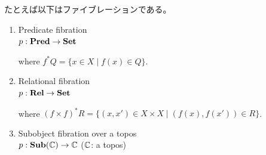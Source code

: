 \documentclass[
		head_space=20mm,
		foot_space=20mm,
		gutter=10mm,
		line_length=190mm
]{jlreq}
\begin{document}
\begin{example}
	たとえば以下はファイブレーションである。
	\begin{enumerate}
		\item Predicate fibration \\ $p:\mathbf{Pred}\to\mathbf{Set}$
		\begin{center}%
		\end{center}
		where $f^\ast Q=\{x\in X\mid f(x)\in Q\}.$ \vspace{2pt}
		\item Relational fibration \\ $p:\mathbf{Rel}\to\mathbf{Set}$
		\begin{center}%
		\end{center}
		where $(f\times f)^\ast R=\{(x,x')\in X\times X\mid (f(x),f(x'))\in R\}$. \vspace{2pt}
		\item Subobject fibration over a topos \\ $p:\mathbf{Sub}(\mathbb{C})\to\mathbb{C}$\; ($\mathbb{C}$: a topos)
		\begin{center}%
			\newsavebox{\smallcdleft}
			\sbox{\smallcdleft}{
				\begin{tikzcd}[row sep=12pt, column sep=15pt,ampersand replacement=\&]

\end{tikzcd}}
\end{center}
\end{enumerate}
\end{example}
\end{document}
